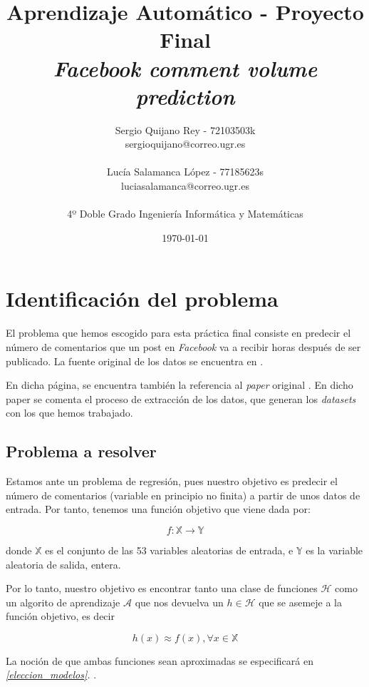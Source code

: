 \documentclass[11pt]{article}
\title{
    {Aprendizaje Automático - Proyecto Final}\\
    {\emph{Facebook comment volume prediction}}
}
\author{
    {Sergio Quijano Rey - 72103503k}\\
    {sergioquijano@correo.ugr.es} \\
    {} \\
    {Lucía Salamanca López - 77185623s} \\
    {luciasalamanca@correo.ugr.es}\\
    {} \\
    {4º Doble Grado Ingeniería Informática y Matemáticas}
}
\date{\today}
\begin{document}
\maketitle
\pagebreak

\tableofcontents

\listoffigures

\listoftables

\pagebreak

\section{Identificación del problema}

El problema que hemos escogido para esta práctica final consiste en predecir el número de comentarios que un post en \emph{Facebook} va a recibir horas después de ser publicado. La fuente original de los datos se encuentra en \cite{uci:online}.

En dicha página, se encuentra también la referencia al \emph{paper} original \cite{original_paper:paper}. En dicho paper se comenta el proceso de extracción de los datos, que generan los \emph{datasets} con los que hemos trabajado.

\subsection{Problema a resolver}

Estamos ante un problema de regresión, pues nuestro objetivo es predecir el número de comentarios (variable en principio no finita) a partir de unos datos de entrada. Por tanto, tenemos una función objetivo que viene dada por:

$$f: \mathbb{X} \rightarrow \mathbb{Y}$$

donde $\mathbb{X}$ es el conjunto de las 53 variables aleatorias de entrada, e $\mathbb{Y}$ es la variable aleatoria de salida, entera.

Por lo tanto, nuestro objetivo es encontrar tanto una clase de funciones $\mathcal{H}$ como un algorito de aprendizaje $\mathcal{A}$ que nos devuelva un $h \in \mathcal{H}$ que se asemeje a la función objetivo, es decir

$$h(x) \approx f(x), \forall x \in \mathbb{X}$$

La noción de que ambas funciones sean aproximadas se especificará en \emph{\ref{eleccion_modelos}. }.
\end{document}
